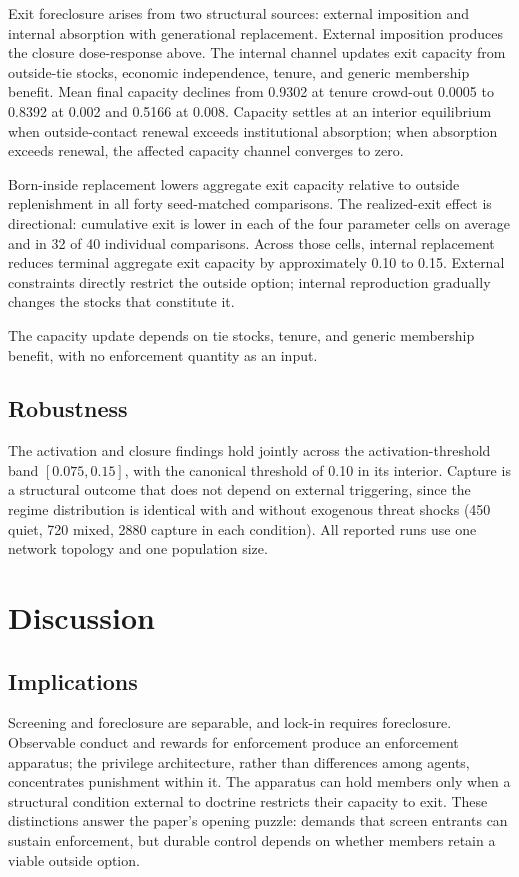 \documentclass[12pt]{article}
\begin{document}
Exit foreclosure arises from two structural sources: external imposition and internal absorption with generational replacement. External imposition produces the closure dose-response above. The internal channel updates exit capacity from outside-tie stocks, economic independence, tenure, and generic membership benefit. Mean final capacity declines from 0.9302 at tenure crowd-out 0.0005 to 0.8392 at 0.002 and 0.5166 at 0.008. Capacity settles at an interior equilibrium when outside-contact renewal exceeds institutional absorption; when absorption exceeds renewal, the affected capacity channel converges to zero.

Born-inside replacement lowers aggregate exit capacity relative to outside replenishment in all forty seed-matched comparisons. The realized-exit effect is directional: cumulative exit is lower in each of the four parameter cells on average and in 32 of 40 individual comparisons. Across those cells, internal replacement reduces terminal aggregate exit capacity by approximately 0.10 to 0.15. External constraints directly restrict the outside option; internal reproduction gradually changes the stocks that constitute it.

The capacity update depends on tie stocks, tenure, and generic membership benefit, with no enforcement quantity as an input.

\subsection{Robustness}

The activation and closure findings hold jointly across the activation-threshold band \([0.075,0.15]\), with the canonical threshold of 0.10 in its interior. Capture is a structural outcome that does not depend on external triggering, since the regime distribution is identical with and without exogenous threat shocks (450 quiet, 720 mixed, 2880 capture in each condition). All reported runs use one network topology and one population size.

\section{Discussion}

\subsection{Implications}

Screening and foreclosure are separable, and lock-in requires foreclosure. Observable conduct and rewards for enforcement produce an enforcement apparatus; the privilege architecture, rather than differences among agents, concentrates punishment within it. The apparatus can hold members only when a structural condition external to doctrine restricts their capacity to exit. These distinctions answer the paper's opening puzzle: demands that screen entrants can sustain enforcement, but durable control depends on whether members retain a viable outside option.
\end{document}
